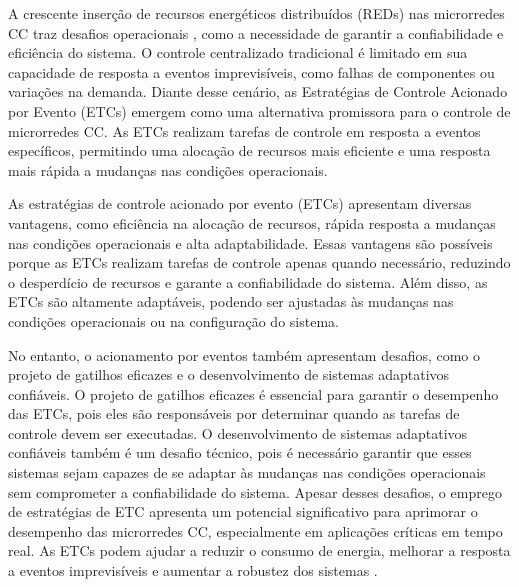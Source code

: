 A crescente inserção de recursos energéticos distribuídos (REDs) nas microrredes CC traz desafios operacionais , como a necessidade de garantir a confiabilidade e eficiência do sistema. O controle centralizado tradicional é limitado em sua capacidade de resposta a eventos imprevisíveis, como falhas de componentes ou variações na demanda. Diante desse cenário, as Estratégias de Controle Acionado por Evento (ETCs) emergem como uma alternativa promissora para o controle de microrredes CC. As ETCs realizam tarefas de controle em resposta a eventos específicos, permitindo uma alocação de recursos mais eficiente e uma resposta mais rápida a mudanças nas condições operacionais.  

As estratégias de controle acionado por evento (ETCs)  apresentam diversas vantagens, como eficiência na alocação de recursos, rápida resposta a mudanças nas condições operacionais e alta adaptabilidade. Essas vantagens são possíveis porque as ETCs realizam tarefas de controle apenas quando necessário, reduzindo o desperdício de recursos e garante a confiabilidade do sistema. Além disso, as ETCs são altamente adaptáveis, podendo ser ajustadas às mudanças nas condições operacionais ou na configuração do sistema.

No entanto, o acionamento por eventos também apresentam desafios, como o projeto de gatilhos  eficazes e o desenvolvimento de sistemas adaptativos confiáveis. O projeto de gatilhos eficazes é essencial para garantir o desempenho das ETCs, pois eles são responsáveis por determinar quando as tarefas de controle devem ser executadas.  O desenvolvimento de sistemas adaptativos confiáveis também é um desafio técnico, pois é necessário garantir que esses sistemas sejam capazes de se adaptar às mudanças nas condições operacionais sem comprometer a confiabilidade do sistema. Apesar desses desafios, o emprego de estratégias de ETC apresenta um potencial significativo para aprimorar o desempenho das microrredes CC, especialmente em aplicações críticas em tempo real. As ETCs podem ajudar a reduzir o consumo de energia, melhorar a resposta a eventos imprevisíveis e aumentar a robustez dos sistemas .

